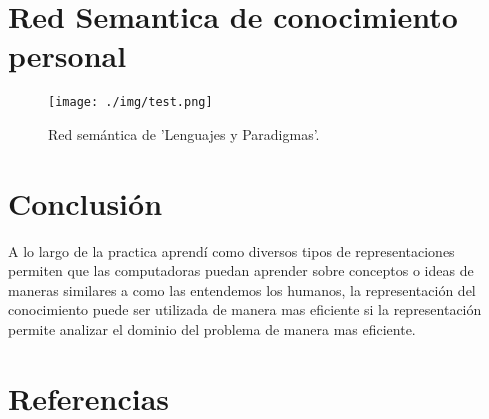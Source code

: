 \documentclass[11pt]{article}
\begin{document}
\section{Red Semantica de conocimiento personal}
\label{sec:org94849d4}
\begin{figure}[htbp]
\centering
\texttt{[image: ./img/test.png]}
\caption{Red semántica de 'Lenguajes y Paradigmas'.}
\end{figure}

\section{Conclusión}
\label{sec:org3792f87}
A lo largo de la practica aprendí como diversos tipos de
representaciones permiten que las computadoras puedan aprender sobre
conceptos o ideas de maneras similares a como las entendemos los
humanos, la representación del conocimiento puede ser utilizada de
manera mas eficiente si la representación permite analizar el dominio
del problema de manera mas eficiente.

\section{Referencias}
\label{sec:org3b307ec}
\printbibliography[heading=none]
\end{document}
